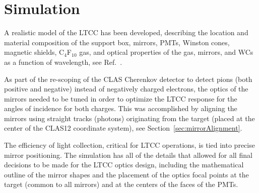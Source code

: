 \section{Simulation}

A realistic model of the LTCC has been developed, describing the location and material composition of the support
box, mirrors, PMTs, Winston cones, magnetic shields, C$_4$F$_{10}$ gas, and optical properties of the gas, mirrors,
and WCs as a function of wavelength, see Ref.~\cite{sim-nim}.

As part of the re-scoping of the CLAS Cherenkov detector to detect pions (both positive and negative) instead of
negatively charged electrons, the optics of the mirrors needed to be tuned in order to optimize the LTCC response
for the angles of incidence for both charges. This was accomplished by aligning the mirrors using straight tracks
(photons) originating from the target (placed at the center of the CLAS12 coordinate system), see
Section~\ref{sec:mirrorAlignment}.

The efficiency of light collection, critical for LTCC operations, is tied into precise mirror positioning. The simulation
has all of the details that allowed for all final decisions to be made for the LTCC optics design, including the
mathematical outline of the mirror shapes and the placement of the optics focal points at the target (common to all
mirrors) and at the centers of the faces of the PMTs.


